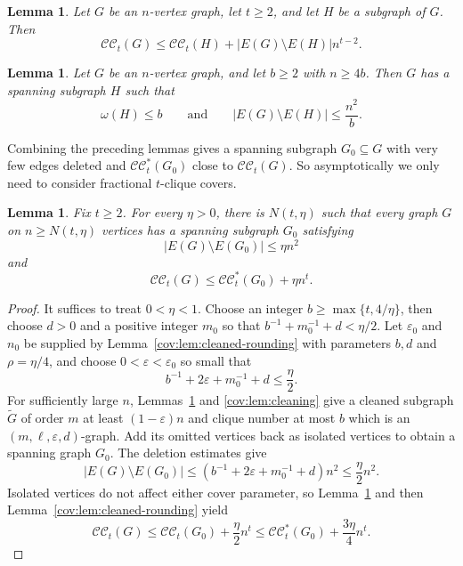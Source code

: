 \documentclass[11pt]{article}
\numberwithin{equation}{section}
\newtheorem{lemma}[theorem]{Lemma}
\theoremstyle{remark}
\newcommand{\e}{\varepsilon}
\newcommand{\CC}{\mathcal{CC}}
\newcommand{\CCstar}{\mathcal{CC}^{*}}
\begin{document}
\begin{lemma}
  \label{cov:lem:restore-edges}
Let \(G\) be an \(n\)-vertex graph, let \(t\ge2\), and let \(H\) be a subgraph of \(G\). Then
\begin{equation*}
\CC_t(G)\le \CC_t(H)+|E(G)\setminus E(H)|n^{t-2}.
\end{equation*}
\end{lemma}

\begin{lemma}
  \label{cov:lem:bounded-clique}
Let \(G\) be an \(n\)-vertex graph, and let \(b\ge2\) with \(n\ge4b\). Then \(G\) has a spanning subgraph \(H\) such that
\begin{equation*}
\omega(H)\le b
\qquad\text{and}\qquad
|E(G)\setminus E(H)|\le \frac{n^2}{b}.
\end{equation*}
\end{lemma}

Combining the preceding lemmas gives a spanning subgraph \(G_0\subseteq G\) with
very few edges deleted and \(\CCstar_t(G_0)\) close to \(\CC_t(G)\).
So asymptotically we only need to consider fractional \(t\)-clique covers.

\begin{lemma}\label{cov:lem:nearby-model}
Fix \(t\ge 2\).  For every \(\eta>0\), there is \(N(t,\eta)\) such that every
graph \(G\) on \(n\ge N(t,\eta)\) vertices has a spanning subgraph \(G_0\) satisfying
\begin{equation*}
|E(G)\setminus E(G_0)|\le \eta n^2
\end{equation*}
and
\begin{equation*}
\CC_t(G)\le \CCstar_t(G_0)+\eta n^t.
\end{equation*}
\end{lemma}

\begin{proof}
It suffices to treat \(0<\eta<1\). Choose an integer \(b\ge\max\{t,4/\eta\}\),
then choose \(d>0\) and a positive integer \(m_0\) so that \(b^{-1}+m_0^{-1}+d<\eta/2\).
Let \(\e_0\) and \(n_0\) be supplied by Lemma~\ref{cov:lem:cleaned-rounding} with parameters \(b,d\) and
\(\rho=\eta/4\), and choose \(0<\varepsilon<\varepsilon_0\) so small that
\begin{equation*}
b^{-1}+2\varepsilon+m_0^{-1}+d\le\frac{\eta}{2}.
\end{equation*}
For sufficiently large \(n\), Lemmas~\ref{cov:lem:bounded-clique} and
\ref{cov:lem:cleaning} give a cleaned subgraph \(\widetilde G\) of order \(m\) at
least \((1-\e)n\) and clique number at most \(b\) which is an \((m,\ell,\e,d)\)-graph.
Add its omitted vertices back as isolated vertices to obtain a spanning graph \(G_0\).
The deletion estimates give
\begin{equation*}
 |E(G)\setminus E(G_0)|
 \le (b^{-1}+2\varepsilon+m_0^{-1}+d)n^2
 \le\frac{\eta}{2}n^2.
\end{equation*}
Isolated vertices do not affect either cover parameter,
so Lemma~\ref{cov:lem:restore-edges} and then Lemma~\ref{cov:lem:cleaned-rounding} yield
\begin{equation*}
 \CC_t(G)\le\CC_t(G_0)+\frac{\eta}{2}n^t
 \le\CCstar_t(G_0)+\frac{3\eta}{4}n^t.
\end{equation*}
\end{proof}
\end{document}
